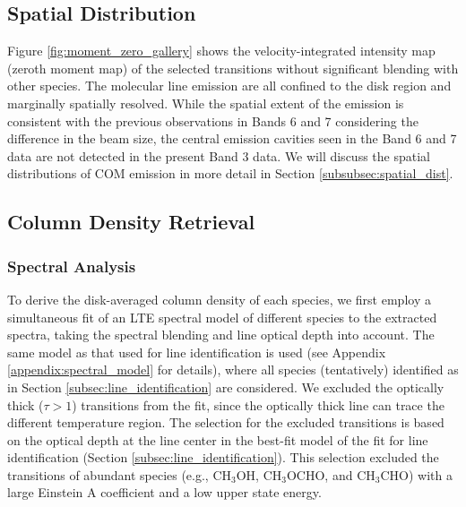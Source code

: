 \documentclass[linenumbers, twocolumn, twocolappendix, astrosymb, times]{aastex631}
\newcommand{\methanol}{CH$_3$OH\xspace}
\newcommand{\acetaldehyde}{CH$_3$CHO\xspace}
\newcommand{\methylformate}{CH$_3$OCHO\xspace}
\begin{document}



\subsection{Spatial Distribution}
Figure \ref{fig:moment_zero_gallery} shows the velocity-integrated intensity map (zeroth moment map) of the selected transitions without significant blending with other species. The molecular line emission are all confined to the disk region and marginally spatially resolved. While the spatial extent of the emission is consistent with the previous observations in Bands 6 and 7 \citep{vantHoff2018, Lee2019, Tobin2023} considering the difference in the beam size, the central emission cavities seen in the Band 6 and 7 data are not detected in the present Band 3 data. We will discuss the spatial distributions of COM emission in more detail in Section \ref{subsubsec:spatial_dist}.


\subsection{Column Density Retrieval}
\subsubsection{Spectral Analysis}\label{subsubsec:spectral_fit}
To derive the disk-averaged column density of each species, we first employ a simultaneous fit of an LTE spectral model of different species to the extracted spectra, taking the spectral blending and line optical depth into account. The same model as that used for line identification is used (see Appendix \ref{appendix:spectral_model} for details), where all species (tentatively) identified as in Section \ref{subsec:line_identification} are considered. We excluded the optically thick ($\tau > 1$) transitions from the fit, since the optically thick line can trace the different temperature region. The selection for the excluded transitions is based on the optical depth at the line center in the best-fit model of the fit for line identification (Section \ref{subsec:line_identification}). This selection excluded the transitions of abundant species (e.g., \methanol, \methylformate, and \acetaldehyde) with a large Einstein A coefficient and a low upper state energy. 
\end{document}
